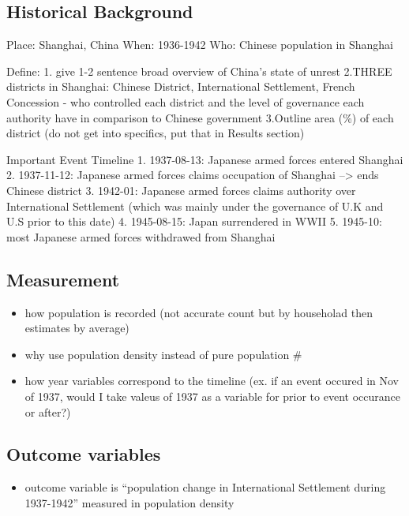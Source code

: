 \documentclass[
  letterpaper,
  DIV=11,
  numbers=noendperiod]{scrartcl}
\providecommand{\tightlist}{%
  \setlength{\itemsep}{0pt}\setlength{\parskip}{0pt}}\usepackage{longtable,booktabs,array}
\begin{document}
\hypertarget{historical-background}{%
\subsection{Historical Background}\label{historical-background}}

Place: Shanghai, China When: 1936-1942 Who: Chinese population in
Shanghai

Define: 1. give 1-2 sentence broad overview of China's state of unrest
2.THREE districts in Shanghai: Chinese District, International
Settlement, French Concession - who controlled each district and the
level of governance each authority have in comparison to Chinese
government 3.Outline area (\%) of each district (do not get into
specifics, put that in Results section)

Important Event Timeline 1. 1937-08-13: Japanese armed forces entered
Shanghai 2. 1937-11-12: Japanese armed forces claims occupation of
Shanghai --\textgreater{} ends Chinese district 3. 1942-01: Japanese
armed forces claims authority over International Settlement (which was
mainly under the governance of U.K and U.S prior to this date) 4.
1945-08-15: Japan surrendered in WWII 5. 1945-10: most Japanese armed
forces withdrawed from Shanghai

\hypertarget{measurement}{%
\subsection{Measurement}\label{measurement}}

\begin{itemize}
\tightlist
\item
  how population is recorded (not accurate count but by householad then
  estimates by average)
\item
  why use population density instead of pure population \#
\item
  how year variables correspond to the timeline (ex. if an event occured
  in Nov of 1937, would I take valeus of 1937 as a variable for prior to
  event occurance or after?)
\end{itemize}

\hypertarget{outcome-variables}{%
\subsection{Outcome variables}\label{outcome-variables}}

\begin{itemize}
\tightlist
\item
  outcome variable is ``population change in International Settlement
  during 1937-1942'' measured in population density
\end{itemize}
\end{document}
